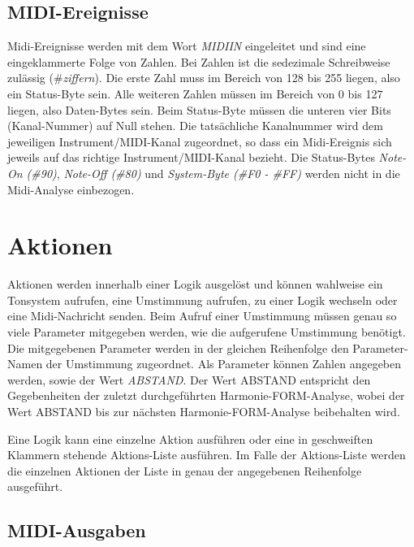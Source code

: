 \subsection{MIDI-Ereignisse}\label{sec:midi-ereignisse}
Midi-Ereignisse werden mit dem Wort \emph{MIDIIN}
eingeleitet und
sind eine eingeklammerte Folge von Zahlen. Bei Zahlen ist die sedezimale
Schreibweise zulässig (\#\emph{ziffern}).\index{\#}
Die erste Zahl muss im Bereich von
128 bis 255 liegen, also ein Status-Byte sein. Alle weiteren Zahlen
müssen im Bereich von 0 bis 127 liegen, also Daten-Bytes sein.
Beim Status-Byte müssen die unteren vier Bits (Kanal-Nummer) auf Null stehen.
Die tatsächliche Kanalnummer wird dem jeweiligen
Instrument/MIDI-Kanal zugeordnet,
so dass ein Midi-Ereignis sich jeweils auf das richtige
Instrument/MIDI-Kanal bezieht.
Die Status-Bytes
 \emph{Note-On (\#90)}, \emph{Note-Off
  (\#80)} und
\emph{System-Byte
 (\#F0 - \#FF)} werden nicht in die Midi-Analyse
einbezogen.

    

\section{Aktionen}\label{sec:aktionen}

Aktionen werden innerhalb einer Logik ausgelöst und können wahlweise
ein Tonsystem aufrufen, eine Umstimmung aufrufen,
zu einer Logik wechseln oder eine Midi-Nachricht
senden. Beim Aufruf einer Umstimmung müssen genau so viele Parameter
mitgegeben werden, wie die aufgerufene Umstimmung benötigt. Die mitgegebenen
Parameter werden in der gleichen Reihenfolge den Parameter-Namen
der Umstimmung zugeordnet. Als Parameter können Zahlen angegeben werden,
sowie der Wert \emph{ABSTAND}.
Der Wert ABSTAND entspricht den Gegebenheiten der
zuletzt durchgeführten Harmonie-FORM-Analyse, wobei der Wert
ABSTAND bis zur nächsten Harmonie-FORM-Analyse beibehalten wird.

Eine Logik kann eine einzelne Aktion ausführen oder eine in geschweiften
Klammern stehende Aktions-Liste aus\-füh\-ren. Im Falle der Aktions-Liste
werden die einzelnen Aktionen der Liste in genau der angegebenen
Reihenfolge ausgeführt.


\subsection{MIDI-Ausgaben}\label{sec:midi-ausgaben}

